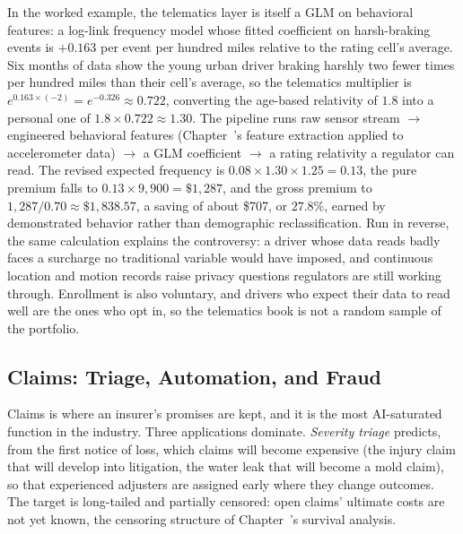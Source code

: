 \documentclass[../ai_in_finance]{subfiles}
\begin{document}
In the worked example, the telematics layer is itself a GLM on behavioral features: a log-link frequency model whose fitted coefficient on harsh-braking events is $+0.163$ per event per hundred miles relative to the rating cell's average. Six months of data show the young urban driver braking harshly two fewer times per hundred miles than their cell's average, so the telematics multiplier is $e^{0.163 \times (-2)} = e^{-0.326} \approx 0.722$, converting the age-based relativity of $1.8$ into a personal one of $1.8 \times 0.722 \approx 1.30$. The pipeline runs raw sensor stream $\rightarrow$ engineered behavioral features (Chapter~'s feature extraction applied to accelerometer data) $\rightarrow$ a GLM coefficient $\rightarrow$ a rating relativity a regulator can read. The revised expected frequency is $0.08 \times 1.30 \times 1.25 = 0.13$, the pure premium falls to $0.13 \times 9{,}900 = \$1{,}287$, and the gross premium to $1{,}287/0.70 \approx \$1{,}838.57$, a saving of about \$707, or $27.8\%$, earned by demonstrated behavior rather than demographic reclassification. Run in reverse, the same calculation explains the controversy: a driver whose data reads badly faces a surcharge no traditional variable would have imposed, and continuous location and motion records raise privacy questions regulators are still working through. Enrollment is also voluntary, and drivers who expect their data to read well are the ones who opt in, so the telematics book is not a random sample of the portfolio.

\subsection{Claims: Triage, Automation, and Fraud}
\label{sec:ins-claims}

Claims is where an insurer's promises are kept, and it is the most AI-saturated function in the industry. Three applications dominate. \emph{Severity triage} predicts, from the first notice of loss, which claims will become expensive (the injury claim that will develop into litigation, the water leak that will become a mold claim), so that experienced adjusters are assigned early where they change outcomes. The target is long-tailed and partially censored: open claims' ultimate costs are not yet known, the censoring structure of Chapter~'s survival analysis.
\end{document}
